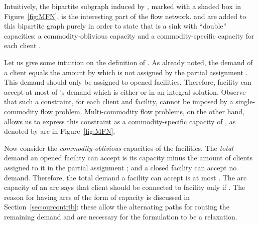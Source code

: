 \begin{remark}
Intuitively, the bipartite subgraph induced by , marked with a shaded box in Figure~\ref{fig:MFN}, is the interesting part of the flow network.  and  are added to this bipartite graph purely in order to state that  is a sink with ``double'' capacities: a commodity-oblivious capacity  and a commodity-specific capacity  for each client .


\end{remark}

Let us give some intuition on the definition of . As already noted,
the demand  of a client  equals the amount by which  is not
assigned by the partial assignment . This demand should only be assigned to opened
facilities. Therefore, facility  can accept at most  of 's demand which is either
 or  in an integral solution.
Observe that such a constraint, for each client and facility, cannot be imposed by a single-commodity flow problem.
Multi-commodity flow problems, on the other hand, allows us to express this constraint as a commodity-specific capacity of , as denoted by arc  in Figure~\ref{fig:MFN}.

Now consider the \emph{commodity-oblivious} capacities of the facilities. The \emph{total} demand an opened facility  can accept
is its capacity minus the amount of clients assigned to it in the partial assignment ; and
a closed facility can accept no demand. Therefore, the total demand a facility  can accept is at
most . The arc capacity  of an arc  says that
client  should be connected to facility  only if . The reason for having arcs of
the form  of capacity  is discussed in Section~\ref{sec:ourcontrib}: these allow the alternating paths for routing the remaining demand and are
necessary for the formulation to be a relaxation.


